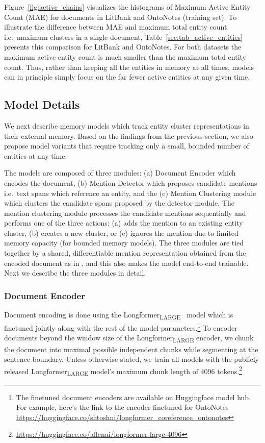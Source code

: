 \documentclass[12pt]{thesis-umich}[thesis]
\begin{document}
 Figure~\ref{fig:active_chains} visualizes the histograms of Maximum Active Entity Count (MAE) for documents in LitBank and OntoNotes (training set). 
To illustrate the difference between MAE and maximum total entity count i.e.\ maximum clusters in a single document, Table~\ref{sec:tab_active_entities} presents this comparison for LitBank and OntoNotes. For both datasets the maximum active entity count is much smaller than the maximum total entity count.
Thus, rather than keeping all the entities in memory at all times, models can in principle simply focus on the far fewer active entities at any given time.



\subsection{Model Details}
\label{sec:longdoc_model}
We next describe memory models which track entity cluster representations in their external memory.  
Based on the findings from the previous section, we also propose model variants that require tracking only a small, bounded number of entities at any time.

The models are composed of three modules: (a) Document Encoder which encodes the document, (b) Mention Detector which proposes candidate mentions i.e.\ text spans which reference an entity, and the (c) Mention Clustering module which clusters the candidate spans proposed by the detector module. 
The mention clustering module processes the candidate mentions sequentially and performs one of the three actions: (a) adds the mention to an existing entity cluster, (b) creates a new cluster, or (c) ignores the mention due to limited memory capacity (for bounded memory models).
The three modules are tied together by a shared, differentiable mention representation obtained from the encoded document as in \citet{lee-etal-2017-end}, and this also makes the model end-to-end trainable. 
Next we describe the three modules in detail.  


\subsubsection{Document Encoder}
\label{sec:doc_encoder}
Document encoding is done using the Longformer\textsubscript{LARGE}~\cite{beltagy2020longformer} model which is finetuned jointly along with the rest of the model parameters.\footnote{The finetuned document encoders are available on Huggingface model hub. For example, here's the link to the encoder finetuned for OntoNotes \url{https://huggingface.co/shtoshni/longformer_coreference_ontonotes}} 
To encoder documents beyond the window size of the Longformer\textsubscript{LARGE} encoder,  we chunk the document into maximal possible independent chunks while segmenting at the sentence boundary. 
Unless otherwise stated, we train all models with the publicly released Longformer\textsubscript{LARGE} model's maximum chunk length of 4096 tokens.\footnote{\url{https://huggingface.co/allenai/longformer-large-4096}} 
\end{document}
